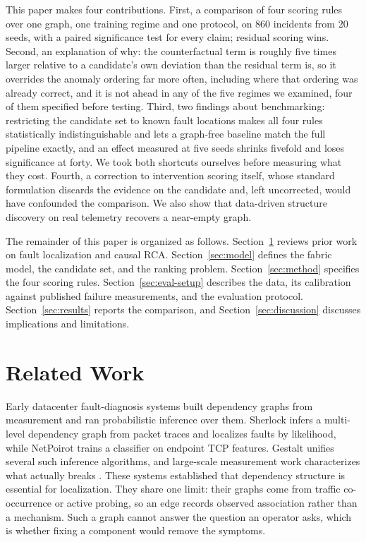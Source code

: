 \documentclass[conference]{IEEEtran}
\begin{document}
This paper makes four contributions. First, a comparison of four scoring rules over one graph, one training regime and one protocol, on 860 incidents from 20 seeds, with a paired significance test for every claim; residual scoring wins. Second, an explanation of why: the counterfactual term is roughly five times larger relative to a candidate's own deviation than the residual term is, so it overrides the anomaly ordering far more often, including where that ordering was already correct, and it is not ahead in any of the five regimes we examined, four of them specified before testing. Third, two findings about benchmarking: restricting the candidate set to known fault locations makes all four rules statistically indistinguishable and lets a graph-free baseline match the full pipeline exactly, and an effect measured at five seeds shrinks fivefold and loses significance at forty. We took both shortcuts ourselves before measuring what they cost. Fourth, a correction to intervention scoring itself, whose standard formulation discards the evidence on the candidate and, left uncorrected, would have confounded the comparison. We also show that data-driven structure discovery on real telemetry recovers a near-empty graph.

The remainder of this paper is organized as follows. Section~\ref{sec:related} reviews prior work on fault localization and causal RCA. Section~\ref{sec:model} defines the fabric model, the candidate set, and the ranking problem. Section~\ref{sec:method} specifies the four scoring rules. Section~\ref{sec:eval-setup} describes the data, its calibration against published failure measurements, and the evaluation protocol. Section~\ref{sec:results} reports the comparison, and Section~\ref{sec:discussion} discusses implications and limitations.

\section{Related Work}
\label{sec:related}
Early datacenter fault-diagnosis systems built dependency graphs from measurement and ran probabilistic inference over them. Sherlock \cite{bahl2007sherlock} infers a multi-level dependency graph from packet traces and localizes faults by likelihood, while NetPoirot \cite{arzani2016netpoirot} trains a classifier on endpoint TCP features. Gestalt \cite{mysore2014gestalt} unifies several such inference algorithms, and large-scale measurement work characterizes what actually breaks \cite{kandula2009detailed,gill2011understanding}. These systems established that dependency structure is essential for localization. They share one limit: their graphs come from traffic co-occurrence or active probing, so an edge records observed association rather than a mechanism. Such a graph cannot answer the question an operator asks, which is whether fixing a component would remove the symptoms.
\end{document}
